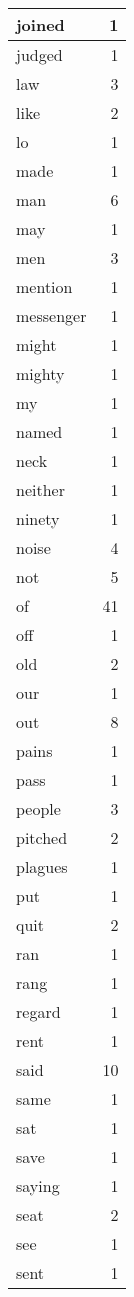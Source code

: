 \begin{center}
\begin{longtable}{l|r}
joined & 1 \\ \hline
judged & 1 \\ \hline
law & 3 \\ \hline
like & 2 \\ \hline
lo & 1 \\ \hline
made & 1 \\ \hline
man & 6 \\ \hline
may & 1 \\ \hline
men & 3 \\ \hline
mention & 1 \\ \hline
messenger & 1 \\ \hline
might & 1 \\ \hline
mighty & 1 \\ \hline
my & 1 \\ \hline
named & 1 \\ \hline
neck & 1 \\ \hline
neither & 1 \\ \hline
ninety & 1 \\ \hline
noise & 4 \\ \hline
not & 5 \\ \hline
of & 41 \\ \hline
off & 1 \\ \hline
old & 2 \\ \hline
our & 1 \\ \hline
out & 8 \\ \hline
pains & 1 \\ \hline
pass & 1 \\ \hline
people & 3 \\ \hline
pitched & 2 \\ \hline
plagues & 1 \\ \hline
put & 1 \\ \hline
quit & 2 \\ \hline
ran & 1 \\ \hline
rang & 1 \\ \hline
regard & 1 \\ \hline
rent & 1 \\ \hline
said & 10 \\ \hline
same & 1 \\ \hline
sat & 1 \\ \hline
save & 1 \\ \hline
saying & 1 \\ \hline
seat & 2 \\ \hline
see & 1 \\ \hline
sent & 1 \\ \hline

\end{longtable}
\end{center}
